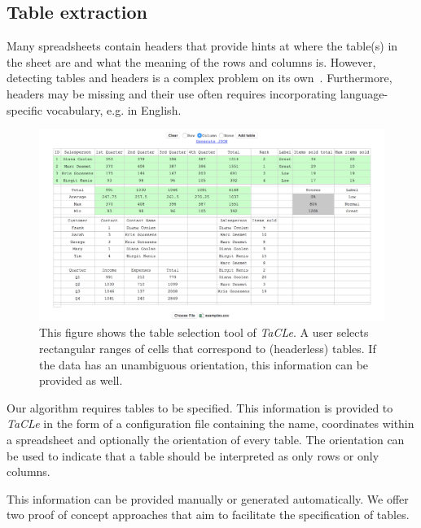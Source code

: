 \documentclass{IEEEtran}
\newcommand{\format}[1]{\textit{#1}\xspace}
\newcommand{\sname}{\format{TaCLe}}
\theoremstyle{definition}
\begin{document}
\subsection{Table extraction}
\label{sec:table_extraction}
Many spreadsheets contain headers that provide hints at where the table(s) in the sheet are and what the meaning of the rows and columns is. However, detecting tables and headers is a complex problem on its own~\cite{header}. Furthermore, headers may be missing and their use often requires incorporating language-specific vocabulary, e.g. in English.

\begin{figure}[t]
  \centering
  \includegraphics[width=1\linewidth]{figures/tabletool.png}
  \caption{This figure shows the table selection tool of \sname. A user selects rectangular ranges of cells that correspond to (headerless) tables. If the data has an unambiguous orientation, this information can be provided as well.}
  \label{fig:visual_tool}
\end{figure}

Our algorithm requires tables to be specified.
This information is provided to \sname in the form of a configuration file containing the name, coordinates within a spreadsheet and optionally the orientation of every table.
The orientation can be used to indicate that a table should be interpreted as only rows or only columns.

This information can be provided manually or generated automatically.
We offer two proof of concept approaches that aim to facilitate the specification of tables.
\end{document}
